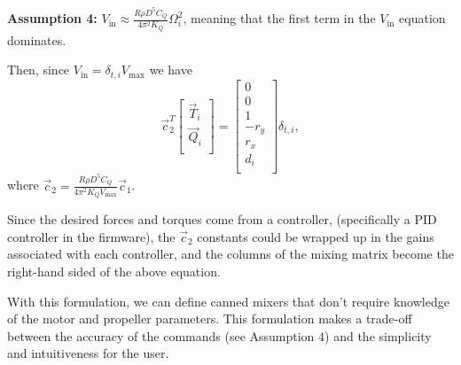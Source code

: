 \documentclass{article}
\begin{document}
\vspace{10pt}
\noindent
\textbf{Assumption 4:} $V_{\text{in}} \approx \frac{R \rho D^5 C_Q}{4 \pi^2 K_Q} \Omega_i^2$, meaning that the first term in the $V_\text{in}$ equation dominates.

\vspace{10pt}
\noindent
Then, since $V_{\text{in}} = \delta_{t,i} V_{\text{max}}$ we have 
\[
\vec{c}^T_2
\begin{bmatrix}
    \Vec{T}_i \\ \Vec{Q}_i \\
\end{bmatrix}
=
\begin{bmatrix}
    0 \\ 
    0 \\
    1 \\ 
    -r_y \\
    r_x \\
    d_i \\
\end{bmatrix}
\delta_{t,i},
\]
where $\vec{c}_2 = \frac{R \rho D^5 C_Q }{4 \pi^2 K_Q V_{\text{max}}} \vec{c}_1$.

Since the desired forces and torques come from a controller, (specifically a PID controller in the firmware), the $\vec{c}_2$ constants could be wrapped up in the gains associated with each controller, and the columns of the mixing matrix become the right-hand sided of the above equation.

With this formulation, we can define canned mixers that don't require knowledge of the motor and propeller parameters.
This formulation makes a trade-off between the accuracy of the commands (see Assumption 4) and the simplicity and intuitiveness for the user.
\end{document}
